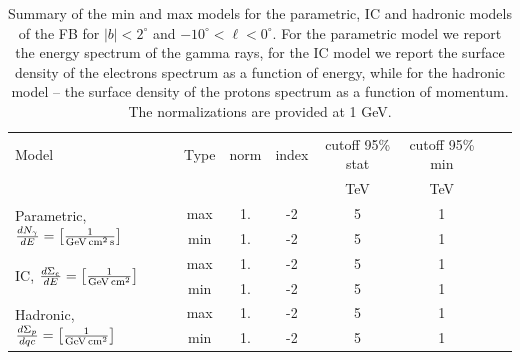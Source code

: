 \begin{table}
  \begin{center}
    \caption{Summary of the min and max models for the parametric, 
    IC and hadronic models of the FB for $|b| < 2^\circ$ and $-10^\circ < \ell < 0^\circ$. 
    For the parametric model we report the energy spectrum of the gamma rays,
    for the IC model we report the surface density of the electrons spectrum as a function of energy,
    while for the hadronic model -- the surface density of the protons spectrum as a function of momentum.
    The normalizations are provided at 1 GeV.}
    \label{tab:summary}
    \begin{tabular}{| l |c|c|c|c|c|c|c|} %
     	\hline
		 {\hspace{2cm}Model} & Type  & norm & index & cutoff 95\% stat & cutoff 95\% min \\ 
		       &        &   &  & {\rm TeV} & {\rm TeV}\\ 
		\hline
  		\multirow{2}{*}{Parametric, $\frac{dN_\gamma}{dE} = \left[{\rm \frac{1}{GeV\, cm^{2}\, s}}\right]$} & max & 1.  & -2 &  5 & 1 \\ 
		& min & 1.  & -2 &  5 & 1  \\ 
 		\hline
  		\multirow{2}{*}{IC, $\frac{d\Sigma_e}{dE} = \left[{\rm \frac{1}{GeV\,cm^2}}\right]$} & max & 1.  & -2 &  5 & 1 \\ 
		& min & 1.  & -2 &  5 & 1  \\ 
 		\hline
  		\multirow{2}{*}{Hadronic, $\frac{d\Sigma_p}{dqc} = \left[{\rm \frac{1}{GeV\,cm^2}}\right]$} & max & 1.  & -2 &  5 & 1 \\ 
		& min & 1.  & -2 &  5 & 1  \\ 
 \hline
    \end{tabular}
  \end{center}
\end{table}

